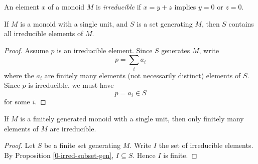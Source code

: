 \begin{definition}
  \label{0-irred}
  \leanok

  An element $x$ of a monoid $M$ is \emph{irreducible} if $x = y + z$ implies $y = 0$ or $z = 0$.
\end{definition}


\begin{proposition}
  \label{0-irred-subset-gen}
  \leanok

  If $M$ is a monoid with a single unit, and $S$ is a set generating $M$, then $S$ contains all irreducible elements of $M$.
\end{proposition}
\begin{proof}
  \leanok

  Assume $p$ is an irreducible element. Since $S$ generates $M$, write
  \[
    p = \sum_i a_i
  \]
  where the $a_i$ are finitely many elements (not necessarily distinct) elements of $S$. Since $p$ is irreducible, we must have
  \[
    p = a_i \in S
  \]
  for some $i$.
\end{proof}


\begin{proposition}
  \label{0-irred-finite}
  \leanok

  If $M$ is a finitely generated monoid with a single unit, then only finitely many elements of $M$ are irreducible.
\end{proposition}
\begin{proof}
  \leanok

  Let $S$ be a finite set generating $M$. Write $I$ the set of irreducible elements. By Proposition \ref{0-irred-subset-gen}, $I \subseteq S$. Hence $I$ is finite.
\end{proof}



